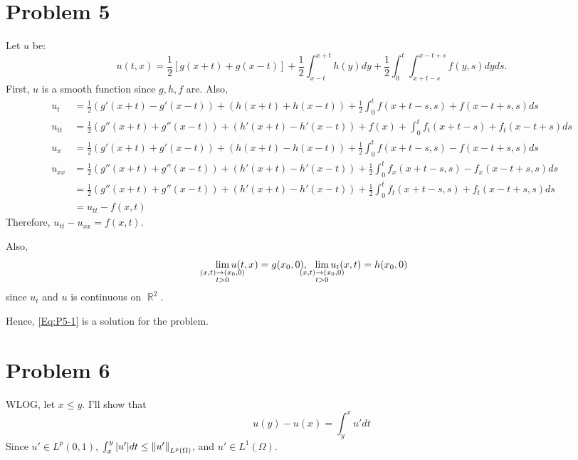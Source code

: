 \documentclass{article}
\DeclareMathOperator{\rr}{\mathbb{R}}
\begin{document}
\section*{Problem 5}
Let $u$ be:
\begin{equation}\label{Eq:P5-1}
u(t,x)=\frac{1}{2}[g(x+t)+g(x-t)]+\frac{1}{2}\int_{x-t}^{x+t} h(y)dy + \frac{1}{2}\int_0^t\int_{x+t-s}^{x-t+s}f(y, s)dyds.
\end{equation}
First, $u$ is a smooth function since $g,h,f$ are. Also,
\begin{equation*}
\begin{split}
u_t&=\frac{1}{2}\left(g'(x+t)-g'(x-t)\right)+\left(h(x+t)+h(x-t)\right)+\frac{1}{2}\int_0^t f(x+t-s, s)+f(x-t+s, s)ds\\
u_{tt}&=\frac{1}{2}\left(g''(x+t)+g''(x-t)\right)+\left(h'(x+t)-h'(x-t)\right)+f(x)+\int_0^t f_t(x+t-s)+f_t(x-t+s)ds\\
u_x&=\frac{1}{2}\left(g'(x+t)+g'(x-t)\right)+\left(h(x+t)-h(x-t)\right)+\frac{1}{2}\int_0^t f(x+t-s, s)-f(x-t+s, s)ds \\
u_{xx}&=\frac{1}{2}\left(g''(x+t)+g''(x-t)\right)+\left(h'(x+t)-h'(x-t)\right)+\frac{1}{2}\int_0^t f_x(x+t-s, s)-f_x(x-t+s, s)ds \\
&=\frac{1}{2}\left(g''(x+t)+g''(x-t)\right)+\left(h'(x+t)-h'(x-t)\right)+\frac{1}{2}\int_0^t f_t(x+t-s, s)+f_t(x-t+s, s)ds \\
&=u_{tt}-f(x,t)
\end{split}
\end{equation*}
Therefore, $u_{tt}-u_{xx}=f(x,t)$.

Also,
\begin{equation*}
\lim_{\mathclap{\substack{(x,t)\rightarrow (x_0, 0)\\ t>0}}} u(t,x)=g(x_0, 0),~~\lim_{\mathclap{\substack{(x,t)\rightarrow (x_0, 0)\\ t>0}}} u_t(x,t)=h(x_0, 0)
\end{equation*}
since $u_t$ and $u$ is continuous on $\rr^2$.

Hence, \eqref{Eq:P5-1} is a solution for the problem.
\section*{Problem 6}
WLOG, let $x\leq y$. I'll show that
\begin{equation*}
u(y)-u(x)=\int_y^x u' dt
\end{equation*}
Since $u'\in L^p(0, 1)$, $\int_x^y \abs{u'} dt\leq \norm{u'}_{L^p(\Omega)}$, and $u'\in L^1(\Omega)$.
\end{document}
